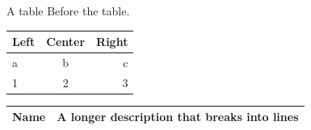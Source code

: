 \documentclass{beamer}
\begin{document}
\begin{frame}{A table}
Before the table.
\begin{tabular}{lcr}
\hline
Left & Center & Right \\
\hline
a & b & c \\
1 & 2 & 3 \\
\hline
\end{tabular}

\begin{center}
\begin{tabular}{|l|p{3cm}|}
\hline
Name & A longer description that breaks into lines \\
\hline
\end{tabular}
\end{center}
\end{frame}
\end{document}
